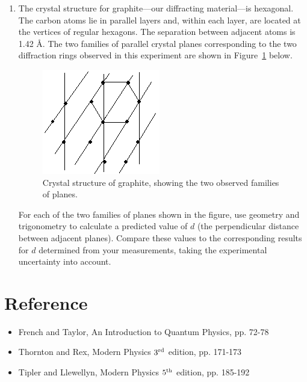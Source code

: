\documentclass{article}
\begin{document}
\begin{enumerate}
\item The crystal structure for graphite---our diffracting
material---is hexagonal. The carbon atoms lie in parallel layers and, within each layer, are located at the vertices of regular hexagons.  The separation between adjacent
atoms is 1.42 \AA.  The two families of parallel crystal planes
corresponding to the two diffraction rings observed in this experiment
are shown in Figure~\ref{fig:graphite} below.
\begin{figure}
\begin{centering}
\includegraphics[width=2.0209in,height=1.802in]{images/ediffraction-img3.png} 
\caption{Crystal structure of graphite, showing the two observed families of planes.}
\label{fig:graphite}
\end{centering}
\end{figure}

For each of the two families of planes shown in the figure, use geometry
and trigonometry to calculate a predicted value of $d$ (the perpendicular
distance between adjacent planes).  Compare these values to the
corresponding results for $d$ determined from your measurements, taking
the experimental uncertainty into account.

\end{enumerate}

\section{Reference}
\begin{itemize}
\item French and Taylor, An Introduction to Quantum Physics, pp. 72-78
\item Thornton and Rex, Modern Physics $3^{\rm rd}$ edition, pp. 171-173
\item Tipler and Llewellyn, Modern Physics $5^{\rm th}$ edition, pp. 185-192
\end{itemize}
\end{document}
